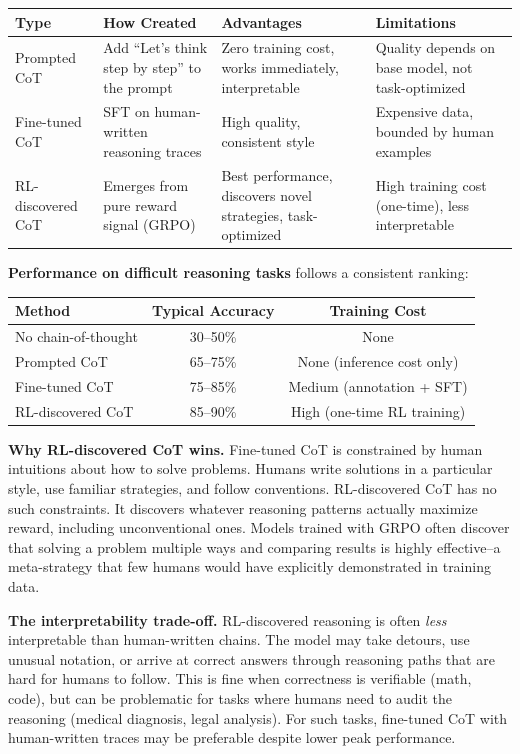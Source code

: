 \begin{chapterenv}
\begin{center}
\begin{tabular}{p{}p{}p{}p{}}
\toprule
\textbf{Type} & \textbf{How Created} & \textbf{Advantages} & \textbf{Limitations} \\
\midrule
Prompted CoT & Add ``Let's think step by step'' to the prompt & Zero training cost, works immediately, interpretable & Quality depends on base model, not task-optimized \\
Fine-tuned CoT & SFT on human-written reasoning traces & High quality, consistent style & Expensive data, bounded by human examples \\
RL-discovered CoT & Emerges from pure reward signal (GRPO) & Best performance, discovers novel strategies, task-optimized & High training cost (one-time), less interpretable \\
\bottomrule
\end{tabular}
\end{center}

\textbf{Performance on difficult reasoning tasks} follows a consistent ranking:

\begin{center}
\begin{tabular}{lcc}
\toprule
\textbf{Method} & \textbf{Typical Accuracy} & \textbf{Training Cost} \\
\midrule
No chain-of-thought & 30--50\% & None \\
Prompted CoT & 65--75\% & None (inference cost only) \\
Fine-tuned CoT & 75--85\% & Medium (annotation + SFT) \\
RL-discovered CoT & 85--90\% & High (one-time RL training) \\
\bottomrule
\end{tabular}
\end{center}

\textbf{Why RL-discovered CoT wins.} Fine-tuned CoT is constrained by human intuitions about how to solve problems. Humans write solutions in a particular style, use familiar strategies, and follow conventions. RL-discovered CoT has no such constraints. It discovers whatever reasoning patterns actually maximize reward, including unconventional ones. Models trained with GRPO often discover that solving a problem multiple ways and comparing results is highly effective--a meta-strategy that few humans would have explicitly demonstrated in training data.

\textbf{The interpretability trade-off.} RL-discovered reasoning is often \textit{less} interpretable than human-written chains. The model may take detours, use unusual notation, or arrive at correct answers through reasoning paths that are hard for humans to follow. This is fine when correctness is verifiable (math, code), but can be problematic for tasks where humans need to audit the reasoning (medical diagnosis, legal analysis). For such tasks, fine-tuned CoT with human-written traces may be preferable despite lower peak performance.


\end{chapterenv}
